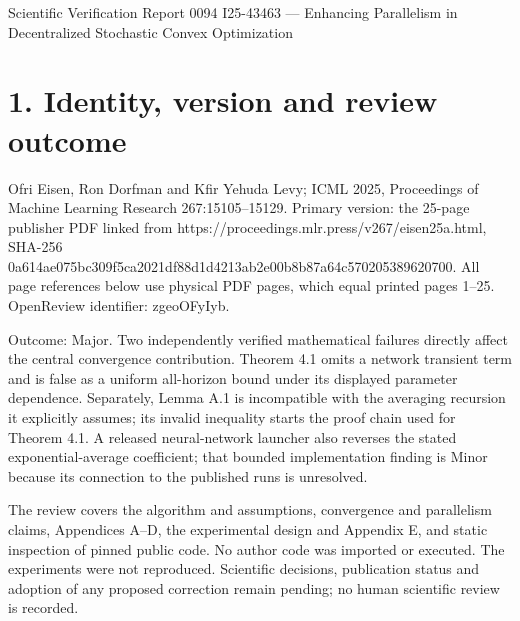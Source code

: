 \documentclass[10pt]{article}
\begin{document}
Scientific Verification Report 0094
I25-43463 — Enhancing Parallelism in Decentralized Stochastic Convex Optimization\par
\section*{1. Identity, version and review outcome}
Ofri Eisen, Ron Dorfman and Kfir Yehuda Levy; ICML 2025, Proceedings of Machine Learning Research 267:15105–15129. Primary version: the 25-page publisher PDF linked from https://proceedings.mlr.press/v267/eisen25a.html, SHA-256 0a614ae075bc309f5ca2021df88d1d4213ab2e00b8b87a64c570205389620700. All page references below use physical PDF pages, which equal printed pages 1–25. OpenReview identifier: zgeoOFyIyb.\par
Outcome: Major. Two independently verified mathematical failures directly affect the central convergence contribution. Theorem 4.1 omits a network transient term and is false as a uniform all-horizon bound under its displayed parameter dependence. Separately, Lemma A.1 is incompatible with the averaging recursion it explicitly assumes; its invalid inequality starts the proof chain used for Theorem 4.1. A released neural-network launcher also reverses the stated exponential-average coefficient; that bounded implementation finding is Minor because its connection to the published runs is unresolved.\par
The review covers the algorithm and assumptions, convergence and parallelism claims, Appendices A–D, the experimental design and Appendix E, and static inspection of pinned public code. No author code was imported or executed. The experiments were not reproduced. Scientific decisions, publication status and adoption of any proposed correction remain pending; no human scientific review is recorded.\par
\end{document}
